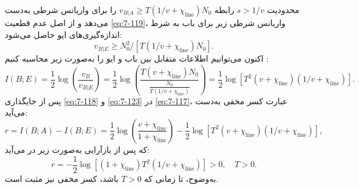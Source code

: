 محدودیت $s > 1/v$ رابطه $v_{B|A} \geq T(1/v + \chi_{\text{line}})N_0$ را برای واریانس شرطی به‌دست می‌دهد و از اصل عدم قطعیت \eqref{eq:7-119}، واریانس شرطی زیر برای باب به شرط اندازه‌گیری‌های ایو حاصل می‌شود:
\begin{equation}
	v_{B|E} \geq N_0^2 / [T(1/v + \chi_{\text{line}})N_0].
	\label{eq:7-122}
\end{equation}
اکنون می‌توانیم اطلاعات متقابل بین باب و ایو را به‌صورت زیر محاسبه کنیم \cite{7-105}:
\begin{equation}
	I(B; E) = \frac{1}{2} \log \left( \frac{v_B}{v_{B|E}} \right) = \frac{1}{2} \log \left( \frac{T(v + \chi_{\text{line}})N_0}{\frac{N_0}{T(1/v + \chi_{\text{line}})}} \right) = \frac{1}{2} \log [T^2(v + \chi_{\text{line}})(1/v + \chi_{\text{line}})].
	\label{eq:7-123}
\end{equation}
پس از جایگذاری \eqref{eq:7-118} و \eqref{eq:7-123} در \eqref{eq:7-117}، عبارت کسر مخفی به‌دست می‌آید:
\begin{equation}
	r = I(B; A) - I(B; E) = \frac{1}{2} \log \left( \frac{v + \chi_{\text{line}}}{1 + \chi_{\text{line}}} \right) - \frac{1}{2} \log [T^2 (v + \chi_{\text{line}})(1/v + \chi_{\text{line}})],
	\label{eq:7-124}
\end{equation}
که پس از بازآرایی به‌صورت زیر در می‌آید:
\begin{equation}
	r = -\frac{1}{2} \log [(1 + \chi_{\text{line}}) T^2 (1/v + \chi_{\text{line}})] > 0, \quad T > 0.
	\label{eq:7-125}
\end{equation}
به‌وضوح، تا زمانی که $T > 0$ باشد، کسر مخفی نیز مثبت است.

